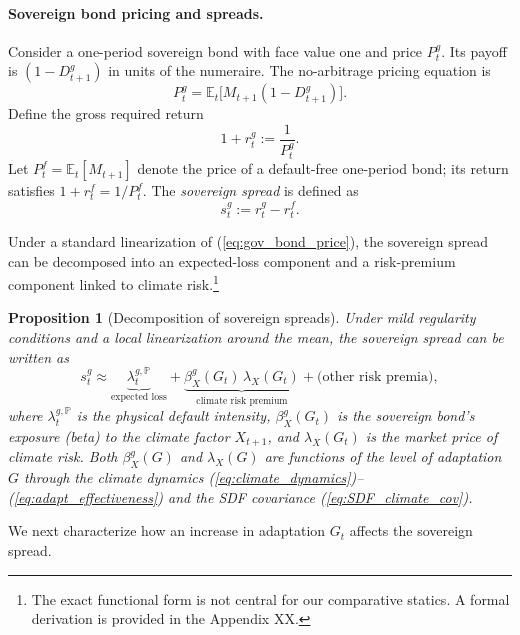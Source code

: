 \documentclass[12pt]{article}
\newtheorem{proposition}{Proposition}
\def\E{\mathbb{E}}
\begin{document}
\paragraph{Sovereign bond pricing and spreads.}
Consider a one-period sovereign bond with face value one and price $P^g_t$.
Its payoff is $(1-D^g_{t+1})$ in units of the numeraire. The no-arbitrage
pricing equation is
\begin{equation}
  P^g_t = \E_t\Big[M_{t+1} (1 - D^g_{t+1})\Big].
  \label{eq:gov_bond_price}
\end{equation}
Define the gross required return
\begin{equation*}
  1 + r^g_t := \frac{1}{P^g_t}.
\end{equation*}
Let $P^f_t = \E_t[M_{t+1}]$ denote the price of a default-free one-period
bond; its return satisfies $1 + r^f_t = 1/P^f_t$. The \emph{sovereign
spread} is defined as
\begin{equation}
  s^g_t := r^g_t - r^f_t.
  \label{eq:sg_def}
\end{equation}

Under a standard linearization of (\ref{eq:gov_bond_price}), the sovereign
spread can be decomposed into an expected-loss component and a risk-premium
component linked to climate risk.\footnote{The exact functional form is not
central for our comparative statics. A formal derivation is provided in
the Appendix XX.}

\begin{proposition}[Decomposition of sovereign spreads]
\label{prop:sg_decomp}
Under mild regularity conditions and a local linearization around the mean,
the sovereign spread can be written as
\begin{equation}
  s^g_t \approx \underbrace{\lambda^{g,\mathbb{P}}_t}_{\text{expected loss}}
           + \underbrace{\beta^g_X(G_t)\, \lambda_X(G_t)}_{\text{climate risk premium}}
           + \text{(other risk premia)},
  \label{eq:sg_decomp}
\end{equation}
where $\lambda^{g,\mathbb{P}}_t$ is the physical default intensity,
$\beta^g_X(G_t)$ is the sovereign bond's exposure (beta) to the climate
factor $X_{t+1}$, and $\lambda_X(G_t)$ is the market price of climate
risk. Both $\beta^g_X(G)$ and $\lambda_X(G)$ are functions of the level of
adaptation $G$ through the climate dynamics
(\ref{eq:climate_dynamics})--(\ref{eq:adapt_effectiveness}) and the SDF
covariance (\ref{eq:SDF_climate_cov}).
\end{proposition}

We next characterize how an increase in adaptation $G_t$ affects the
sovereign spread.
\end{document}
